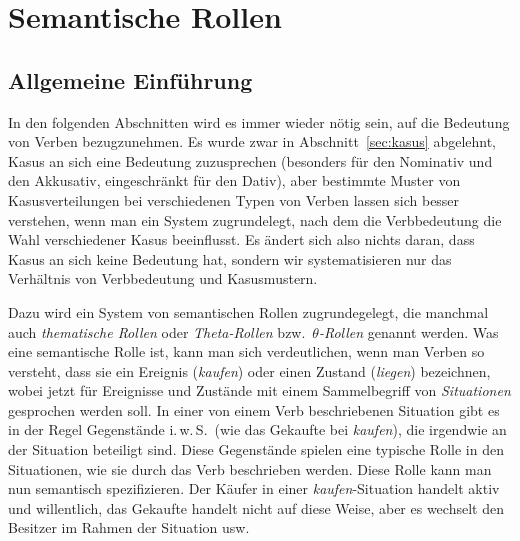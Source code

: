 \section{Semantische Rollen}

\label{sec:semantischerollen}

\subsection{Allgemeine Einführung}

In den folgenden Abschnitten wird es immer wieder nötig sein, auf die Bedeutung von Verben bezugzunehmen.
Es wurde zwar in Abschnitt~\ref{sec:kasus} abgelehnt, Kasus an sich eine Bedeutung zuzusprechen (besonders für den Nominativ und den Akkusativ, eingeschränkt für den Dativ), aber bestimmte Muster von Kasusverteilungen bei verschiedenen Typen von Verben lassen sich besser verstehen, wenn man ein System zugrundelegt, nach dem die Verbbedeutung die Wahl verschiedener Kasus beeinflusst.
Es ändert sich also nichts daran, dass Kasus an sich keine Bedeutung hat, sondern wir systematisieren nur das Verhältnis von Verbbedeutung und Kasusmustern.

Dazu wird ein System von semantischen Rollen zugrundegelegt, die manchmal auch \textit{thematische Rollen} oder \textit{Theta-Rollen} bzw.\ $\theta$\textit{-Rollen} genannt werden.
Was eine semantische Rolle ist, kann man sich verdeutlichen, wenn man Verben so versteht, dass sie ein Ereignis (\zB \textit{kaufen}) oder einen Zustand (\zB \textit{liegen}) bezeichnen, wobei jetzt für Ereignisse und Zustände mit einem Sammelbegriff von \textit{Situationen} gesprochen werden soll.
In einer von einem Verb beschriebenen Situation gibt es in der Regel Gegenstände i.\,w.\,S.\ (wie das Gekaufte bei \textit{kaufen}), die irgendwie an der Situation beteiligt sind.
Diese Gegenstände spielen eine typische Rolle in den Situationen, wie sie durch das Verb beschrieben werden.
Diese Rolle kann man nun semantisch spezifizieren.
Der Käufer in einer \textit{kaufen}-Situation handelt \zB aktiv und willentlich, das Gekaufte handelt nicht auf diese Weise, aber es wechselt den Besitzer im Rahmen der Situation usw.



